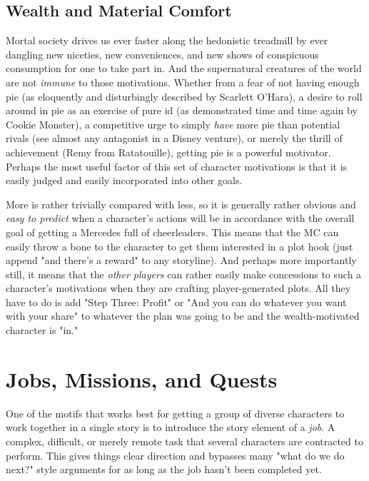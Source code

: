 \subsection{Wealth and Material Comfort}

Mortal society drives us ever faster along the hedonistic treadmill by ever dangling new niceties, new conveniences, and new shows of conspicuous consumption for one to take part in. And the supernatural creatures of the world are not \textit{immune} to those motivations. Whether from a fear of not having enough pie (as eloquently and disturbingly described by Scarlett O'Hara), a desire to roll around in pie as an exercise of pure id (as demonstrated time and time again by Cookie Monster), a competitive urge to simply \textit{have} more pie than potential rivals (see almost any antagonist in a Disney venture), or merely the thrill of achievement (Remy from Ratatouille), getting pie is a powerful motivator. Perhaps the most useful factor of this set of character motivations is that it is easily judged and easily incorporated into other goals.

More is rather trivially compared with less, so it is generally rather obvious and \textit{easy to predict} when a character's actions will be in accordance with the overall goal of getting a Mercedes full of cheerleaders. This means that the MC can easily throw a bone to the character to get them interested in a plot hook (just append "and there's a reward" to any storyline). And perhaps more importantly still, it means that the \textit{other players} can rather easily make concessions to such a character's motivations when they are crafting player-generated plots. All they have to do is add "Step Three: Profit" or "And you can do whatever you want with your share" to whatever the plan was going to be and the wealth-motivated character is "in."

\section{Jobs, Missions, and Quests}

One of the motifs that works best for getting a group of diverse characters to work together in a single story is to introduce the story element of a \textit{job}. A complex, difficult, or merely remote task that several characters are contracted to perform. This gives things clear direction and bypasses many "what do we do next?" style arguments for as long as the job hasn't been completed yet.

